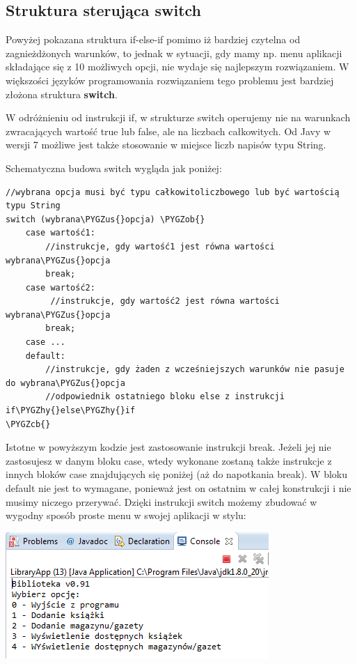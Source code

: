 \documentclass[letterpaper,10pt,english]{sphinxmanual}
\def\PYGZus{\char`\_}
\def\PYGZob{\char`\{}
\def\PYGZcb{\char`\}}
\def\PYGZhy{\char`\-}
\begin{document}
\subsection{Struktura sterująca switch}
\label{sterowanie:struktura-sterujaca-switch}
Powyżej pokazana struktura if-else-if pomimo iż bardziej czytelna od zagnieżdżonych warunków, to jednak w sytuacji, gdy mamy np. menu aplikacji składające się z 10 możliwych opcji, nie wydaje się najlepszym rozwiązaniem. W większości języków programowania rozwiązaniem tego problemu jest bardziej złożona struktura \textbf{switch}.

W odróżnieniu od instrukcji if, w strukturze switch operujemy nie na warunkach zwracających wartość true lub false, ale na liczbach całkowitych. Od Javy w wersji 7 możliwe jest także stosowanie w miejsce liczb napisów typu String.

Schematyczna budowa switch wygląda jak poniżej:

\begin{Verbatim}[commandchars=\\\{\}]
//wybrana opcja musi być typu całkowitoliczbowego lub być wartością typu String
switch (wybrana\PYGZus{}opcja) \PYGZob{}
    case wartość1:
        //instrukcje, gdy wartość1 jest równa wartości wybrana\PYGZus{}opcja
        break;
    case wartość2:
         //instrukcje, gdy wartość2 jest równa wartości wybrana\PYGZus{}opcja
        break;
    case ...
    default:
        //instrukcje, gdy żaden z wcześniejszych warunków nie pasuje do wybrana\PYGZus{}opcja
        //odpowiednik ostatniego bloku else z instrukcji if\PYGZhy{}else\PYGZhy{}if
\PYGZcb{}
\end{Verbatim}

Istotne w powyższym kodzie jest zastosowanie instrukcji break. Jeżeli jej nie zastosujesz w danym bloku case, wtedy wykonane zostaną także instrukcje z innych bloków case znajdujących się poniżej (aż do napotkania break). W bloku default nie jest to wymagane, ponieważ jest on ostatnim w całej konstrukcji i nie musimy niczego przerywać.
Dzięki instrukcji switch możemy zbudować w wygodny sposób proste menu w swojej aplikacji w stylu:

{\hfill\includegraphics{library.png}\hfill}
\end{document}
